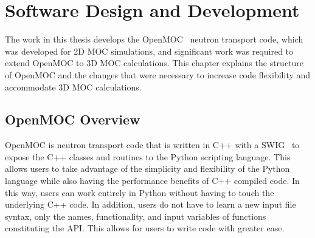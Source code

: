 \chapter{Software Design and Development}
\label{chap:software-design}

The work in this thesis develops the OpenMOC~\cite{openmoc} neutron transport code, which was developed for 2D \ac{MOC} simulations, and significant work was required to extend OpenMOC to 3D \ac{MOC} calculations. This chapter explains the structure of OpenMOC and the changes that were necessary to increase code flexibility and accommodate 3D \ac{MOC} calculations. 


\section{OpenMOC Overview}
\label{sec:openmoc-overview}

OpenMOC is neutron transport code that is written in C++ with a \ac{SWIG}~\cite{swig} to expose the C++ classes and routines to the Python scripting language. This allows users to take advantage of the simplicity and flexibility of the Python language while also having the performance benefits of C++ compiled code. In this way, users can work entirely in Python without having to touch the underlying C++ code. In addition, users do not have to learn a new input file syntax, only the names, functionality, and input variables of functions constituting the \ac{API}. This allows for users to write code with greater ease.

